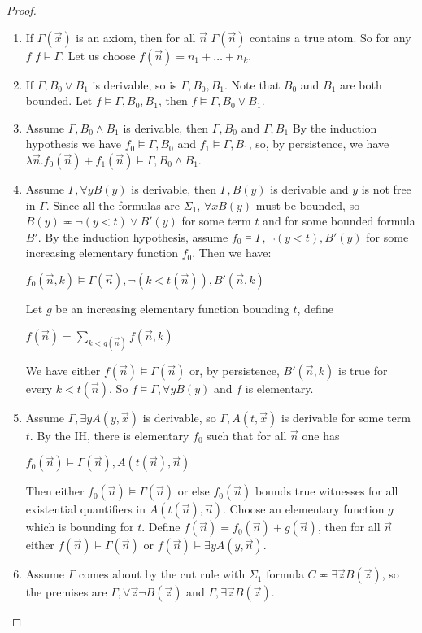 \documentclass[8pt]{article}
\theoremstyle{definition}
\theoremstyle{definition}
\theoremstyle{definition}
\theoremstyle{definition}
\theoremstyle{definition}
\theoremstyle{definition}
\theoremstyle{definition}
\theoremstyle{definition}
\theoremstyle{definition}
\theoremstyle{definition}
\theoremstyle{definition}
\theoremstyle{definition}
\theoremstyle{definition}
\theoremstyle{question}
\begin{document}
\begin{proof}
  \begin{enumerate}
    \item If $\Gamma(\vec{x})$ is an axiom, then for all $\vec{n}$ $\Gamma(\vec{n})$ contains a true atom.
    So for any $f$ $f \models \Gamma$. Let us choose $f(\vec{n}) = n_1 + \dots + n_k$.
    \item If $\Gamma, B_0 \vee B_1$ is derivable, so is $\Gamma, B_0, B_1$. Note that $B_0$ and $B_1$ are both bounded.
    Let $f \models \Gamma, B_0, B_1$, then $f \models \Gamma, B_0 \vee B_1$.
    \item Assume $\Gamma, B_0 \land B_1$ is derivable, then $\Gamma, B_0$ and $\Gamma, B_1$
    By the induction hypothesis we have $f_0 \models \Gamma, B_0$ and $f_1 \models \Gamma, B_1$, so, by persistence,
    we have $\lambda \vec{n}. f_0(\vec{n}) + f_1(\vec{n}) \models \Gamma, B_0 \land B_1$.
    \item Assume $\Gamma, \forall y B(y)$ is derivable, then $\Gamma, B(y)$ is derivable and $y$ is not free in $\Gamma$.
    Since all the formulas are $\Sigma_1$, $\forall x B(y)$ must be bounded, so $B(y) \eqcirc \neg (y < t) \lor B'(y)$ for some
    term $t$ and for some bounded formula $B'$.
    By the induction hypothesis, assume $f_0 \models \Gamma, \neg (y < t), B'(y)$ for some increasing elementary function $f_0$.
    Then we have:
    \begin{center}
      $f_0(\vec{n}, k) \models \Gamma(\vec{n}), \neg (k < t(\vec{n})), B'(\vec{n}, k)$
    \end{center}
    Let $g$ be an increasing elementary function bounding $t$, define
    \begin{center}
      $f(\vec{n}) = \sum \limits_{k < g(\vec{n})} f(\vec{n}, k)$
    \end{center}
    We have either $f(\vec{n}) \models \Gamma(\vec{n})$ or, by persistence, $B'(\vec{n}, k)$ is true for every $k < t(\vec{n})$.
    So $f \models \Gamma, \forall y B(y)$ and $f$ is elementary.
    \item Assume $\Gamma, \exists y A(y, \vec{x})$ is derivable, so $\Gamma, A(t, \vec{x})$ is derivable for some term $t$.
    By the IH, there is elementary $f_0$ such that for all $\vec{n}$ one has
    \begin{center}
      $f_0(\vec{n}) \models \Gamma(\vec{n}), A(t(\vec{n}), \vec{n})$
    \end{center}
    Then either $f_0(\vec{n}) \models \Gamma(\vec{n})$ or else $f_0(\vec{n})$ bounds true witnesses for all
    existential quantifiers in $A(t(\vec{n}), \vec{n})$. Choose an elementary function $g$ which is bounding for $t$.
    Define $f(\vec{n}) = f_0(\vec{n}) + g(\vec{n})$, then for all $\vec{n}$ either 
    $f(\vec{n}) \models \Gamma(\vec{n})$ or $f(\vec{n}) \models \exists y A(y, \vec{n})$.
    \item Assume $\Gamma$ comes about by the cut rule with $\Sigma_1$ formula 
    $C \eqcirc \exists \vec{z} B(\vec{z})$, so the premises are
    $\Gamma, \forall \vec{z} \neg B(\vec{z})$ and $\Gamma, \exists \vec{z} B(\vec{z})$.


\end{enumerate}
\end{proof}
\end{document}

